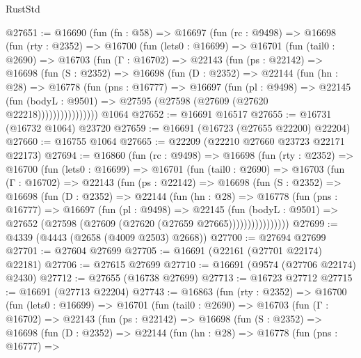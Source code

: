 \begin{lexlean}{RustStd}
\begin{coremodule}
@27651 := @16690
    (fun (fn : @58) =>
    @16697
      (fun (rc : @9498) =>
      @16698
        (fun (rty : @2352) =>
        @16700
          (fun (lets0 : @16699) =>
          @16701
            (fun (tail0 : @2690) =>
            @16703
              (fun (Γ : @16702) =>
              @22143
                (fun (ps : @22142) =>
                @16698
                  (fun (S : @2352) =>
                  @16698
                    (fun (D : @2352) =>
                    @22144
                      (fun (hn : @28) =>
                      @16778
                        (fun (pns : @16777) =>
                        @16697
                          (fun (pl : @9498) =>
                          @22145
                            (fun (bodyL : @9501) =>
                            @27595 (@27598 (@27609 (@27620 @22218))))))))))))))))
    @1064
@27652 := @16691 @16517
@27655 := @16731 (@16732 @1064) @23720
@27659 := @16691 (@16723 (@27655 @22200) @22204)
@27660 := @16755 @1064
@27665 := @22209 (@22210 @27660 @23723 @22171 @22173)
@27694 := @16860
    (fun (rc : @9498) =>
    @16698
      (fun (rty : @2352) =>
      @16700
        (fun (lets0 : @16699) =>
        @16701
          (fun (tail0 : @2690) =>
          @16703
            (fun (Γ : @16702) =>
            @22143
              (fun (ps : @22142) =>
              @16698
                (fun (S : @2352) =>
                @16698
                  (fun (D : @2352) =>
                  @22144
                    (fun (hn : @28) =>
                    @16778
                      (fun (pns : @16777) =>
                      @16697
                        (fun (pl : @9498) =>
                        @22145
                          (fun (bodyL : @9501) =>
                          @27652 (@27598 (@27609 (@27620 (@27659 @27665))))))))))))))))
@27699 := @4339 (@4443 (@2658 (@4009 @2503) @2668))
@27700 := @27694 @27699
@27701 := @27604 @27699
@27705 := @16691 (@22161 (@27701 @22174) @22181)
@27706 := @27615 @27699
@27710 := @16691 (@9574 (@27706 @22174) @2430)
@27712 := @27655 (@16738 @27699)
@27713 := @16723 @27712
@27715 := @16691 (@27713 @22204)
@27743 := @16863
    (fun (rty : @2352) =>
    @16700
      (fun (lets0 : @16699) =>
      @16701
        (fun (tail0 : @2690) =>
        @16703
          (fun (Γ : @16702) =>
          @22143
            (fun (ps : @22142) =>
            @16698
              (fun (S : @2352) =>
              @16698
                (fun (D : @2352) =>
                @22144
                  (fun (hn : @28) =>
                  @16778
                    (fun (pns : @16777) =>

\end{coremodule}
\end{lexlean}
